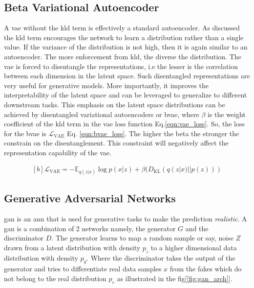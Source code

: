 \subsection{Beta Variational Autoencoder}
\label{subsec:bvae}
A \ac{vae} without the \ac{kld} term is effectively a standard autoencoder. As discussed the \ac{kld} term encourages the network to learn a distribution rather than a single value. If the variance of the distribution is not high, then it is again similar to an autoencoder. The more enforcement from \ac{kld}, the diverse the distribution. The \ac{vae} is forced to disentangle the representations, i.e the lesser is the correlation between each dimension in the latent space. Such disentangled representations are very useful for generative models. More importantly, it improves the interpretability of the latent space and can be leveraged to generalize to different downstream tasks. This emphasis on the latent space distributions can be achieved by disentangled variational autoencoders or \ac{bvae}, where $\beta$ is the weight coefficient of the \ac{kld} term in the \ac{vae} loss function Eq.\ref{eqn:vae_loss}. So, the loss for the \ac{bvae} is $\mathcal{L}_{\mathrm{VAE}}$ Eq. \ref{eqn:bvae_loss}. The higher the beta the stronger the constrain on the disentanglement. This constraint will negatively affect the representation capability of the \ac{vae}.

\begin{equation} \label{eqn:bvae_loss}
    \begin{gathered}[b]
        \mathcal{L}_{\mathrm{VAE}}=-\mathbb{E}_{q(z | x)} \log p(x | z) + \beta (D_{\mathrm{KL}}(q(z | x) || p(z)))
    \end{gathered}
\end{equation}

\subsection{Generative Adversarial Networks}
\ac{gan} is an \ac{ann} that is used for generative tasks to make the prediction \textit{realistic}. A \ac{gan} is a combination of 2 networks namely, the generator $G$ and the discriminator $D$. The generator learns to map a random sample or say, noise $Z$ drawn from a latent distribution with density $p_{z}$ to a higher dimensional data distribution with density $p_{g}$. Where the discriminator takes the output of the generator and tries to differentiate real data samples $x$ from the fakes which do not belong to the real distribution $p_{r}$  as illustrated in the fig[\ref{fig:gan_arch}].

